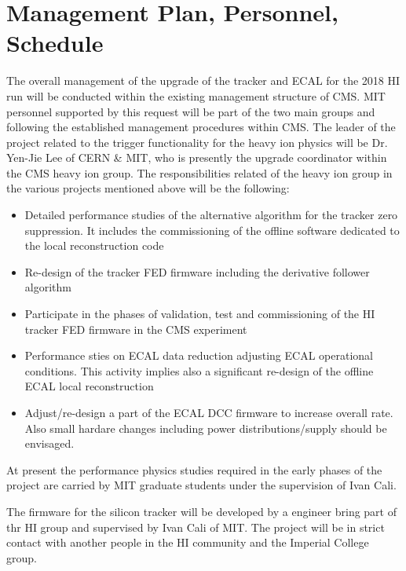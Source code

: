 \section{Management Plan, Personnel, Schedule}
\label{sec:management}

The overall management of the upgrade of the tracker and ECAL for the 2018 HI run will be conducted within the existing management
structure of CMS. MIT personnel supported by this request will be part of the two main groups and following the
established management procedures within CMS. The leader of the project related to the trigger functionality for
the heavy ion physics will be Dr. Yen-Jie Lee of CERN \& MIT, who is presently the upgrade coordinator within the CMS
heavy ion group. 
The responsibilities related of the heavy ion group in the various projects mentioned above will be the following:

\begin{itemize}
\item Detailed performance studies of the alternative algorithm for the tracker zero suppression. It includes the
commissioning of the offline software dedicated to the local reconstruction code
\item Re-design of the tracker FED firmware including the derivative follower algorithm
\item Participate in the phases of validation, test and commissioning of the HI tracker FED firmware in the CMS experiment
\item Performance sties on ECAL data reduction adjusting ECAL operational conditions. This activity implies also a
significant re-design of the offline ECAL local reconstruction
\item Adjust/re-design a part of the ECAL DCC firmware to increase overall rate. Also small hardare changes including power distributions/supply should be envisaged. 
\end{itemize}

At present the performance physics studies required in the early phases of the project are carried by MIT graduate students under the supervision of Ivan Cali. 

 
The firmware for the silicon tracker will be developed by a engineer bring part of thr HI group and supervised by Ivan Cali of MIT. The project will be in strict contact with another people in the HI community and the Imperial College group.

